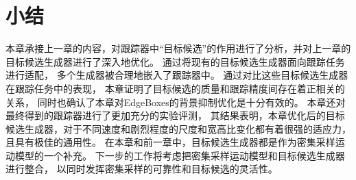 \section{小结}
本章承接上一章的内容，对跟踪器中``目标候选''的作用进行了分析，并对上一章的目标候选生成器进行了深入地优化。
通过将现有的目标候选生成器面向跟踪任务进行适配，
多个生成器被合理地嵌入了跟踪器中。
通过对比这些目标候选生成器在跟踪任务中的表现，
本章证明了目标候选的质量和跟踪精度间存在着正相关的关系，
同时也确认了本章对EdgeBoxes的背景抑制优化是十分有效的。
本章还对最终得到的跟踪器进行了更加充分的实验评测，
其结果表明，本章优化后的目标候选生成器，对于不同速度和剧烈程度的尺度和宽高比变化都有着很强的适应力，
且具有极佳的通用性。
在本章和前一章中，目标候选生成器都是作为密集采样运动模型的一个补充。
下一步的工作将考虑把密集采样运动模型和目标候选生成器进行整合，
以同时发挥密集采样的可靠性和目标候选的灵活性。
